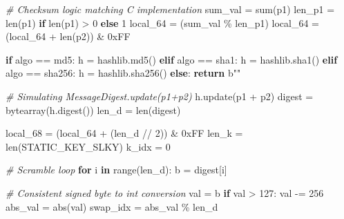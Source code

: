 \documentclass[
]{article}
\newenvironment{Shaded}{}{}
\newcommand{\BaseNTok}[1]{\textcolor[rgb]{0.25,0.63,0.44}{#1}}
\newcommand{\BuiltInTok}[1]{\textcolor[rgb]{0.00,0.50,0.00}{#1}}
\newcommand{\CommentTok}[1]{\textcolor[rgb]{0.38,0.63,0.69}{\textit{#1}}}
\newcommand{\ControlFlowTok}[1]{\textcolor[rgb]{0.00,0.44,0.13}{\textbf{#1}}}
\newcommand{\DecValTok}[1]{\textcolor[rgb]{0.25,0.63,0.44}{#1}}
\newcommand{\KeywordTok}[1]{\textcolor[rgb]{0.00,0.44,0.13}{\textbf{#1}}}
\newcommand{\NormalTok}[1]{#1}
\newcommand{\OperatorTok}[1]{\textcolor[rgb]{0.40,0.40,0.40}{#1}}
\newcommand{\StringTok}[1]{\textcolor[rgb]{0.25,0.44,0.63}{#1}}
\begin{document}
\begin{Shaded}
\begin{Highlighting}[]
    \CommentTok{\# Checksum logic matching C implementation}
\NormalTok{    sum\_val }\OperatorTok{=} \BuiltInTok{sum}\NormalTok{(p1)}
\NormalTok{    len\_p1 }\OperatorTok{=} \BuiltInTok{len}\NormalTok{(p1) }\ControlFlowTok{if} \BuiltInTok{len}\NormalTok{(p1) }\OperatorTok{\textgreater{}} \DecValTok{0} \ControlFlowTok{else} \DecValTok{1}
\NormalTok{    local\_64 }\OperatorTok{=}\NormalTok{ (sum\_val }\OperatorTok{\%}\NormalTok{ len\_p1)}
\NormalTok{    local\_64 }\OperatorTok{=}\NormalTok{ (local\_64 }\OperatorTok{+} \BuiltInTok{len}\NormalTok{(p2)) }\OperatorTok{\&} \BaseNTok{0xFF}
    
    \ControlFlowTok{if}\NormalTok{ algo }\OperatorTok{==} \StringTok{\textquotesingle{}md5\textquotesingle{}}\NormalTok{: h }\OperatorTok{=}\NormalTok{ hashlib.md5()}
    \ControlFlowTok{elif}\NormalTok{ algo }\OperatorTok{==} \StringTok{\textquotesingle{}sha1\textquotesingle{}}\NormalTok{: h }\OperatorTok{=}\NormalTok{ hashlib.sha1()}
    \ControlFlowTok{elif}\NormalTok{ algo }\OperatorTok{==} \StringTok{\textquotesingle{}sha256\textquotesingle{}}\NormalTok{: h }\OperatorTok{=}\NormalTok{ hashlib.sha256()}
    \ControlFlowTok{else}\NormalTok{: }\ControlFlowTok{return} \StringTok{b""}
    
    \CommentTok{\# Simulating MessageDigest.update(p1+p2)}
\NormalTok{    h.update(p1 }\OperatorTok{+}\NormalTok{ p2)}
\NormalTok{    digest }\OperatorTok{=} \BuiltInTok{bytearray}\NormalTok{(h.digest())}
\NormalTok{    len\_d }\OperatorTok{=} \BuiltInTok{len}\NormalTok{(digest)}
    
\NormalTok{    local\_68 }\OperatorTok{=}\NormalTok{ (local\_64 }\OperatorTok{+}\NormalTok{ (len\_d }\OperatorTok{//} \DecValTok{2}\NormalTok{)) }\OperatorTok{\&} \BaseNTok{0xFF}
\NormalTok{    len\_k }\OperatorTok{=} \BuiltInTok{len}\NormalTok{(STATIC\_KEY\_SLKY)}
\NormalTok{    k\_idx }\OperatorTok{=} \DecValTok{0}
    
    \CommentTok{\# Scramble loop}
    \ControlFlowTok{for}\NormalTok{ i }\KeywordTok{in} \BuiltInTok{range}\NormalTok{(len\_d):}
\NormalTok{        b }\OperatorTok{=}\NormalTok{ digest[i]}
        
        \CommentTok{\# Consistent signed byte to int conversion}
\NormalTok{        val }\OperatorTok{=}\NormalTok{ b}
        \ControlFlowTok{if}\NormalTok{ val }\OperatorTok{\textgreater{}} \DecValTok{127}\NormalTok{: val }\OperatorTok{{-}=} \DecValTok{256}
\NormalTok{        abs\_val }\OperatorTok{=} \BuiltInTok{abs}\NormalTok{(val)}
\NormalTok{        swap\_idx }\OperatorTok{=}\NormalTok{ abs\_val }\OperatorTok{\%}\NormalTok{ len\_d}
        

\end{Highlighting}
\end{Shaded}
\end{document}
